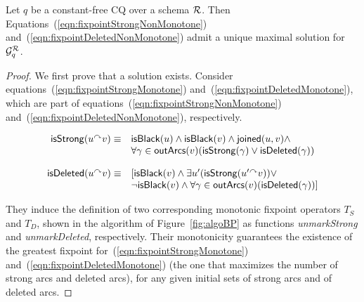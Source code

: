 \begin{theorem}\label{the:GFP-exists-unique}
	Let $q$ be a constant-free
	CQ over a schema $\mathcal{R}$. Then Equations~(\ref{eqn:fixpointStrongNonMonotone})   and~(\ref{eqn:fixpointDeletedNonMonotone}) admit a unique maximal solution for $\mathcal{G}_q^{\mathcal{R}}$.
\end{theorem}
%
\begin{proof}
We first prove that a solution exists.  Consider
equations~(\ref{eqn:fixpointStrongMonotone})
and~(\ref{eqn:fixpointDeletedMonotone}), which are part of equations~(\ref{eqn:fixpointStrongNonMonotone}) and~(\ref{eqn:fixpointDeletedNonMonotone}), respectively.

\begin{equation}\label{eqn:fixpointStrongMonotone}
  \begin{array}{rl}
    \isStrong(u\arc v) \equiv %
    & \isBlack(u) \land \isBlack(v) \land \joined(u,v) \land \\
    & \forall \gamma \in \outArcs(v) (\isStrong(\gamma) \lor \isDeleted(\gamma))
  \end{array}
\end{equation}

\begin{equation}\label{eqn:fixpointDeletedMonotone}
  \begin{array}{rl}
    \mbox{\textsf{isDeleted}}(u\mbox{$^{\curvearrowright}$} v) \equiv
    & [\mbox{\textsf{isBlack}}(v) \land \exists u' (\mbox{\textsf{isStrong}}(u'\mbox{$^{\curvearrowright}$} v)) \lor \\
    & \lnot \mbox{\textsf{isBlack}}(v) \land \forall\gamma \in \textsf{outArcs}(v) (\mbox{\textsf{isDeleted}}(\gamma))]
  \end{array}
\end{equation}

They induce the definition of two corresponding monotonic fixpoint operators $T_{S}$ and $T_{D}$, shown in the algorithm of Figure~\ref{fig:algoBP} as functions \textit{unmarkStrong} and \textit{unmarkDeleted}, respectively.
Their monotonicity guarantees the existence of the greatest fixpoint for~(\ref{eqn:fixpointStrongMonotone}) and~(\ref{eqn:fixpointDeletedMonotone}) (the one that maximizes the number of strong arcs and deleted arcs), for any given initial sets of strong arcs and of deleted arcs.


\end{proof}
